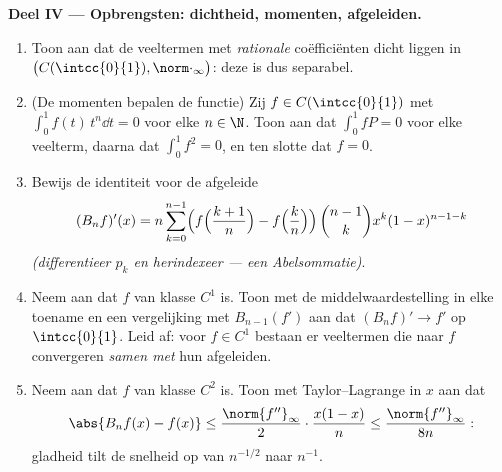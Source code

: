 \begin{problem}
\medskip
\noindent\textbf{Deel IV --- Opbrengsten: dichtheid, momenten,
afgeleiden.}
\begin{enumerate}[resume]
  \item Toon aan dat de veeltermen met \emph{rationale}
        coëfficiënten dicht liggen in $\bigl(C(\intcc{0}{1}),
        \norm\cdot_\infty\bigr)$: deze  is dus
        separabel.
  \item (De momenten bepalen de functie) Zij $f \in
        C(\intcc{0}{1})$ met $\int_0^1 f(t)\,t^n \dd t = 0$ voor
        elke $n \in \N$. Toon aan dat $\int_0^1 f P = 0$ voor elke
        veelterm, daarna dat $\int_0^1 f^2 = 0$, en ten slotte dat
        $f = 0$.
  \item Bewijs de identiteit voor de afgeleide
        \[
        (B_nf)'(x) = n\sum_{k=0}^{n-1}\Bigl(
        f\Bigl(\frac{k+1}{n}\Bigr) -
        f\Bigl(\frac kn\Bigr)\Bigr)\,
        \binom{n-1}{k}x^k(1-x)^{n-1-k}
        \]
        \emph{(differentieer $p_k$ en herindexeer --- een
        Abelsommatie)}.
  \item Neem aan dat $f$ van klasse $C^1$ is. Toon met de
        middelwaardestelling in elke toename en een vergelijking
        met $B_{n-1}(f')$ aan dat $(B_nf)' \to f'$  op
        $\intcc{0}{1}$. Leid af: voor $f \in C^1$ bestaan er
        veeltermen die naar $f$ convergeren \emph{samen met} hun
        afgeleiden.
  \item Neem aan dat $f$ van klasse $C^2$ is. Toon met
        Taylor--Lagrange in $x$ aan dat
        \[
        \abs{B_nf(x) - f(x)} \leq
        \frac{\norm{f''}_\infty}{2}\cdot\frac{x(1-x)}{n}
        \leq \frac{\norm{f''}_\infty}{8n} :
        \]
        gladheid tilt de snelheid op van $n^{-1/2}$ naar
        $n^{-1}$.
\end{enumerate}


\end{problem}
